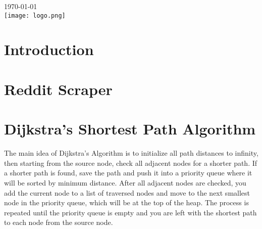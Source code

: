 \begin{titlepage}


{\large \today}\\[2cm] %


\texttt{[image: logo.png]}\\[1cm] %


\vfill %

\end{titlepage}


\begin{abstract}

\end{abstract}

\section{Introduction}

\section{Reddit Scraper}

\section{Dijkstra's Shortest Path Algorithm}
	The main idea of Dijkstra's Algorithm is to initialize all path distances to infinity, then starting from the source node, check all adjacent nodes for a shorter path. If a shorter path is found, save the path and push it into a priority queue where it will be sorted by minimum distance. After all adjacent nodes are checked, you add the current node to a list of traversed nodes and move to the next smallest node in the priority queue, which will be at the top of the heap. The process is repeated until the priority queue is empty and you are left with the shortest path to each node from the source node.


